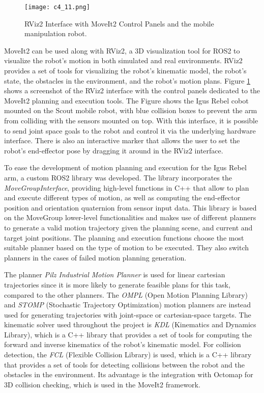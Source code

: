 \begin{figure}[t]
    \centering
    \texttt{[image: c4\_11.png]}
    \caption{RViz2 Interface with MoveIt2 Control Panels and the mobile manipulation robot.}
    \label{fig:rviz2}
\end{figure}


MoveIt2 can be used along with RViz2, a 3D visualization tool for ROS2 to visualize the
robot's motion in both simulated and real environments. RViz2 provides a set of tools for visualizing the robot's
kinematic model, the robot's state, the obstacles in the environment, and the robot's motion plans.
Figure \ref{fig:rviz2} shows a screenshot of the RViz2 interface with the control panels dedicated to the MoveIt2
planning and execution tools. The Figure shows the Igus Rebel cobot mounted on the Scout mobile robot,
with blue collision boxes to prevent the arm from colliding with the sensors mounted on top.
With this interface, it is possible to send joint space goals to the robot
and control it via the underlying hardware interface. There is also an interactive marker that allows the user
to set the robot's end-effector pose by dragging it around in the RViz2 interface.

To ease the development of motion planning and execution for the Igus Rebel arm, a custom ROS2 library was developed.
The library incorporates the \textit{MoveGroupInterface}, providing high-level functions
in C++ that allow to plan and execute different types of motion, as well as computing the end-effector position
and orientation quaternion from sensor input data. This library is based on the MoveGroup lower-level functionalities 
and makes use of different planners to generate a valid motion trajectory given the planning scene, and current and target
joint positions. The planning and execution functions choose the most suitable planner based on the type of motion
to be executed. They also switch planners in the cases of failed motion planning generation.

The planner \textit{Pilz Industrial Motion Planner} is used for linear cartesian trajectories 
since it is more likely to generate feasible plans for this task, compared to the other planners.
The \textit{OMPL} (Open Motion Planning Library) and
\textit{STOMP} (Stochastic Trajectory Optimization) motion planners
are instead used for generating trajectories with joint-space or cartesian-space targets.
The kinematic solver used throughout the project is \textit{KDL} (Kinematics and Dynamics Library), which is a C++ library
that provides a set of tools for computing the forward and inverse kinematics of the robot's kinematic model.
For collision detection, the \textit{FCL} (Flexible Collision Library) is used, which is a C++ library that provides
a set of tools for detecting collisions between the robot and the obstacles in the environment.
Its advantage is the integration with Octomap for 3D collision checking, which is used in the MoveIt2 framework.

